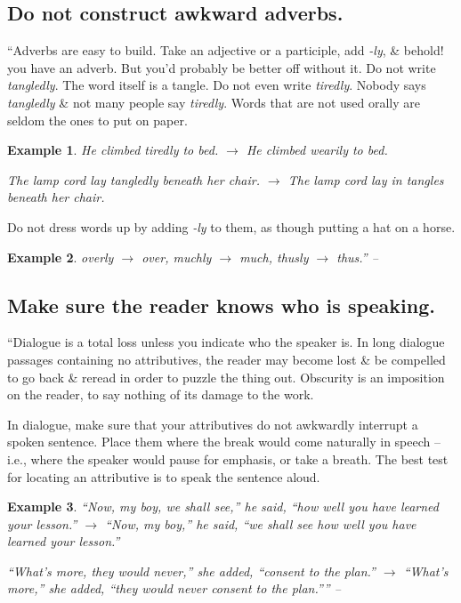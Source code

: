 \documentclass{article}
\numberwithin{equation}{section}
\newtheorem{example}{Example}[section]
\begin{document}

\subsection{Do not construct awkward adverbs.}
``Adverbs are easy to build. Take an adjective or a participle, add \textit{-ly}, \& behold! you have an adverb. But you'd probably be better off without it. Do not write \textit{tangledly}. The word itself is a tangle. Do not even write \textit{tiredly}. Nobody says \textit{tangledly} \& not many people say \textit{tiredly}. Words that are not used orally are seldom the ones to put on paper.
\begin{example}
	He climbed tiredly to bed. $\to$ He climbed wearily to bed.
	
	The lamp cord lay tangledly beneath her chair. $\to$ The lamp cord lay in tangles beneath her chair.
\end{example}
Do not dress words up by adding \textit{-ly} to them, as though putting a hat on a horse.
\begin{example}
	overly $\to$ over, muchly $\to$ much, thusly $\to$ thus.'' -- \cite[p. 90]{Strunk_White2019}
\end{example}



\subsection{Make sure the reader knows who is speaking.}
``Dialogue is a total loss unless you indicate who the speaker is. In long dialogue passages containing no attributives, the reader may become lost \& be compelled to go back \& reread in order to puzzle the thing out. Obscurity is an imposition on the reader, to say nothing of its damage to the work.

In dialogue, make sure that your attributives do not awkwardly interrupt a spoken sentence. Place them where the break would come naturally in speech -- i.e., where the speaker would pause for emphasis, or take a breath. The best test for locating an attributive is to speak the sentence aloud.
\begin{example}
	``Now, my boy, we shall see,'' he said, ``how well you have learned your lesson.'' $\to$ ``Now, my boy,'' he said, ``we shall see how well you have learned your lesson.''
	
	``What's more, they would never,'' she added, ``consent to the plan.'' $\to$  ``What's more,'' she added, ``they would never consent to the plan.'''' -- \cite[p. 91]{Strunk_White2019}
\end{example}
\end{document}

